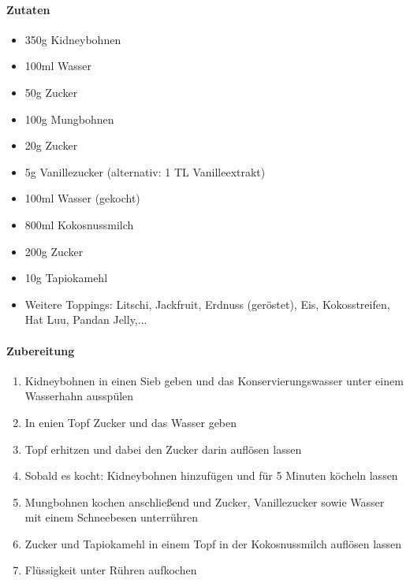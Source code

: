 \clearpage
{}
\label{CheThapCam}

\paragraph{Zutaten}
\begin{itemize}[noitemsep]
	\item 350g Kidneybohnen
	\item 100ml Wasser
	\item 50g Zucker
	\item 100g Mungbohnen
	\item 20g Zucker
	\item 5g Vanillezucker (alternativ: 1 TL Vanilleextrakt)
	\item 100ml Wasser (gekocht)
	\item 800ml Kokosnussmilch
	\item 200g Zucker
	\item 10g Tapiokamehl
	\item Weitere Toppings: Litschi, Jackfruit, Erdnuss (geröstet), Eis, Kokosstreifen, Hat Luu, Pandan Jelly,...
\end{itemize}

\paragraph{Zubereitung}
\begin{enumerate}[noitemsep]
	\item Kidneybohnen in einen Sieb geben und das Konservierungswasser unter einem Wasserhahn ausspülen
	\item In enien Topf Zucker und das Wasser geben 
	\item Topf erhitzen und dabei den Zucker darin auflösen lassen
	\item Sobald es kocht: Kidneybohnen hinzufügen und für 5 Minuten köcheln lassen
	\item Mungbohnen kochen anschließend und Zucker, Vanillezucker sowie Wasser mit einem Schneebesen unterrühren
	\item Zucker und Tapiokamehl in einem Topf in der Kokosnussmilch auflösen lassen
	\item Flüssigkeit unter Rühren aufkochen
\end{enumerate}